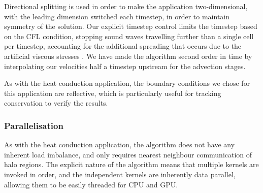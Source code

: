 \documentclass[runningheads,a4paper]{llncs}
\begin{document}
Directional splitting is used in order to make the application two-dimensional, with the leading dimension switched each timestep, in order to maintain symmetry of the solution. Our explicit timestep control limits the timestep based on the CFL condition, stopping sound waves travelling further than a single cell per timestep, accounting for the additional spreading that occurs due to the artificial viscous stresses \cite{Bowers1991}. We have made the algorithm second order in time by interpolating our velocities half a timestep upstream for the advection stages.

As with the heat conduction application, the boundary conditions we chose for this application are reflective, which is particularly useful for tracking conservation to verify the results.

\subsubsection{Parallelisation}

As with the heat conduction application, the algorithm does not have any inherent load imbalance, and only requires nearest neighbour communication of halo regions. The explicit nature of the algorithm means that multiple kernels are invoked in order, and the independent kernels are inherently data parallel, allowing them to be easily threaded for CPU and GPU.
\end{document}
